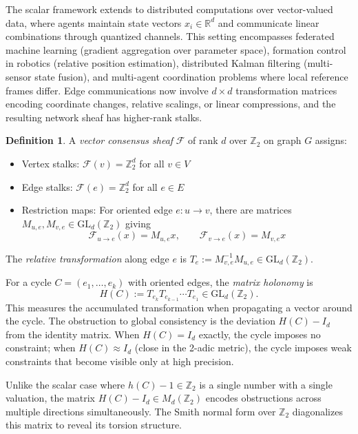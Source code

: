 \documentclass[11pt]{amsart}
\theoremstyle{plain}
\theoremstyle{definition}
\newtheorem{definition}[theorem]{Definition}
\newcommand{\sheaf}[1]{\mathcal{#1}}                  %
\newcommand{\stalk}[2]{#1(#2)}                        %
\newcommand{\face}{\to}                               %
\newcommand{\res}[3]{#1_{#2 \face #3}}                  %
\begin{document}
The scalar framework extends to distributed computations over vector-valued data, where agents maintain state vectors $x_i \in \mathbb{R}^d$ and communicate linear combinations through quantized channels. This setting encompasses federated machine learning (gradient aggregation over parameter space), formation control in robotics (relative position estimation), distributed Kalman filtering (multi-sensor state fusion), and multi-agent coordination problems where local reference frames differ. Edge communications now involve $d \times d$ transformation matrices encoding coordinate changes, relative scalings, or linear compressions, and the resulting network sheaf has higher-rank stalks.

\begin{definition}
\label{def:vector-sheaf}
A \emph{vector consensus sheaf} $\sheaf{F}$ of rank $d$ over $\mathbb{Z}_2$ on graph $G$ assigns:
\begin{itemize}
\item Vertex stalks: $\stalk{\sheaf{F}}{v} = \mathbb{Z}_2^d$ for all $v \in V$
\item Edge stalks: $\stalk{\sheaf{F}}{e} = \mathbb{Z}_2^d$ for all $e \in E$
\item Restriction maps: For oriented edge $e: u \to v$, there are matrices $M_{u,e}, M_{v,e} \in \mathrm{GL}_d(\mathbb{Z}_2)$ giving
\[
\res{\sheaf{F}}{u}{e}(x) = M_{u,e} x, \qquad \res{\sheaf{F}}{v}{e}(x) = M_{v,e} x
\]
\end{itemize}
The \emph{relative transformation} along edge $e$ is $T_e := M_{v,e}^{-1} M_{u,e} \in \mathrm{GL}_d(\mathbb{Z}_2)$.
\end{definition}

For a cycle $C = (e_1, \ldots, e_k)$ with oriented edges, the \emph{matrix holonomy} is
\[
H(C) := T_{e_k} T_{e_{k-1}} \cdots T_{e_1} \in \mathrm{GL}_d(\mathbb{Z}_2).
\]
This measures the accumulated transformation when propagating a vector around the cycle. The obstruction to global consistency is the deviation $H(C) - I_d$ from the identity matrix. When $H(C) = I_d$ exactly, the cycle imposes no constraint; when $H(C) \approx I_d$ (close in the 2-adic metric), the cycle imposes weak constraints that become visible only at high precision.

Unlike the scalar case where $h(C) - 1 \in \mathbb{Z}_2$ is a single number with a single valuation, the matrix $H(C) - I_d \in M_d(\mathbb{Z}_2)$ encodes obstructions across multiple directions simultaneously. The Smith normal form over $\mathbb{Z}_2$ diagonalizes this matrix to reveal its torsion structure.
\end{document}
